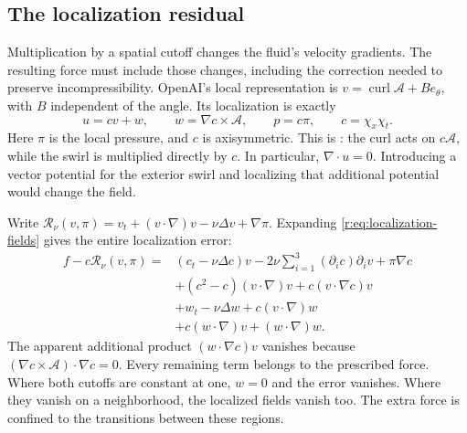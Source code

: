 \subsection{The localization residual}

Multiplication by a spatial cutoff changes the fluid's velocity gradients.
The resulting force must include those changes, including the correction
needed to preserve incompressibility. OpenAI's local representation is
\(v=\operatorname{curl}\mathcal A+B e_\theta\), with \(B\) independent
of the angle. Its localization is exactly
\begin{equation}
 u=cv+w,\qquad w=\nabla c\times\mathcal A,\qquad p=c\pi,
 \qquad c=\chi_x\chi_t.
 \label{r:eq:localization-fields}
\end{equation}
Here \(\pi\) is the local pressure, and \(c\) is axisymmetric.
This is \cite[(10.4)]{openai-paper}: the curl acts on \(c\mathcal A\),
while the swirl is multiplied directly by \(c\). In particular,
\(\nabla\cdot u=0\). Introducing a vector potential for the exterior
swirl and localizing that additional potential would change the field.

Write \(\mathcal R_\nu(v,\pi)=v_t+(v\cdot\nabla)v-\nu\Delta v+\nabla\pi\).
Expanding \eqref{r:eq:localization-fields} gives the entire localization error:
\begin{equation}
\begin{aligned}
 f-c\mathcal R_\nu(v,\pi)
 ={}&(c_t-\nu\Delta c)v-2\nu\sum_{i=1}^3(\partial_i c)\partial_i v
       +\pi\nabla c\\
 &+(c^2-c)(v\cdot\nabla)v+c(v\cdot\nabla c)v\\
 &+w_t-\nu\Delta w+c(v\cdot\nabla)w\\
 &+c(w\cdot\nabla)v+(w\cdot\nabla)w.
\end{aligned}
\label{r:eq:localization-residual}
\end{equation}
The apparent additional product \((w\cdot\nabla c)v\) vanishes because
\((\nabla c\times\mathcal A)\cdot\nabla c=0\).
Every remaining term belongs to the prescribed force. Where
both cutoffs are constant at one, \(w=0\) and the error vanishes.
Where they vanish on a neighborhood, the localized fields vanish too.
The extra force is confined to the transitions between these regions.

